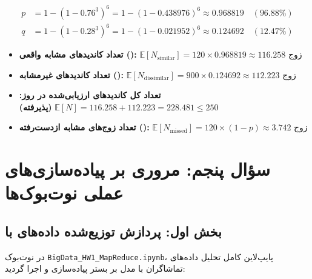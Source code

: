 \documentclass[11pt,a4paper]{article}
\begin{document}
	\begin{tcolorbox}[accentcard, title={مشخصات و محاسبات دقیق تنظیم منتخب $(b=6, r=3)$}]
		\small
		\begin{align*}
			p &= 1 - (1 - 0.76^3)^6 = 1 - (1 - 0.438976)^6 \approx 0.968819 \quad (96.88\%) \\
			q &= 1 - (1 - 0.28^3)^6 = 1 - (1 - 0.021952)^6 \approx 0.124692 \quad (12.47\%)
		\end{align*}
		\vspace{-0.1cm}
		\begin{itemize}
			\item \textbf{تعداد کاندیدهای مشابه واقعی ():} $\mathbb{E}[N_{\text{similar}}] = 120 \times 0.968819 \approx 116.258 \text{ زوج}$
			\item \textbf{تعداد کاندیدهای غیرمشابه ():} $\mathbb{E}[N_{\text{dissimilar}}] = 900 \times 0.124692 \approx 112.223 \text{ زوج}$
			\item \textbf{تعداد کل کاندیدهای ارزیابی‌شده در روز:} $\mathbb{E}[N] = 116.258 + 112.223 = 228.481 \le 250$ \quad \textbf{(پذیرفته)}
			\item \textbf{تعداد زوج‌های مشابه ازدست‌رفته ():} $\mathbb{E}[N_{\text{missed}}] = 120 \times (1 - p) \approx 3.742 \text{ زوج}$
		\end{itemize}
	\end{tcolorbox}
	
	\newpage
	\section{سؤال پنجم: مروری بر پیاده‌سازی‌های عملی نوت‌بوک‌ها}
	
	\subsection{بخش اول: پردازش توزیع‌شده داده‌های  با }
	در نوت‌بوک \texttt{BigData\_HW1\_MapReduce.ipynb}، پایپ‌لاین کامل تحلیل داده‌های تماشاگران با مدل  بر بستر  پیاده‌سازی و اجرا گردید:
	
\end{document}
